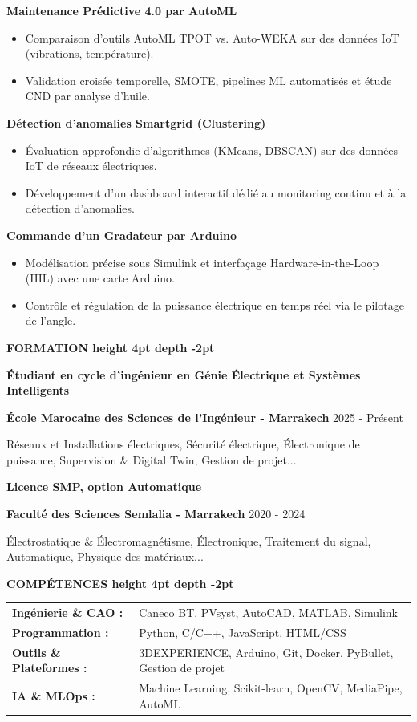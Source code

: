 \documentclass[10pt,a4paper]{altacv}
\renewcommand{\cvsection}[2][]{%
  \medskip%
  {\color{heading}\LARGE\bfseries #2 \hspace{0.2em}\leaders\vrule height 4pt depth -2pt\hfill\mbox{}}\par\smallskip
}
\renewcommand{\cvevent}[4]{%
  {\large\bfseries\color{accent}#1\par}
  \smallskip\normalsize
  \ifstrequal{#2}{}{}{%
    \textbf{\color{emphasis}#2\ifstrequal{#4}{}{}{ - #4}}%
  }%
  \hfill
  \ifstrequal{#3}{}{}{{\small#3}}%
  \par\smallskip
}
\begin{document}
{\large\bfseries\color{accent} Maintenance Prédictive 4.0 par AutoML}\\[0.05cm]
\begin{itemize}
  \item Comparaison d'outils AutoML TPOT vs. Auto-WEKA sur des données IoT (vibrations, température).
  \item Validation croisée temporelle, SMOTE, pipelines ML automatisés et étude CND par analyse d'huile.
\end{itemize}

{\large\bfseries\color{accent} Détection d'anomalies Smartgrid (Clustering)}\\[0.05cm]
\begin{itemize}
  \item Évaluation approfondie d'algorithmes (KMeans, DBSCAN) sur des données IoT de réseaux électriques.
  \item Développement d'un dashboard interactif dédié au monitoring continu et à la détection d'anomalies.
\end{itemize}

{\large\bfseries\color{accent} Commande d'un Gradateur par Arduino}\\[0.05cm]
\begin{itemize}
  \item Modélisation précise sous Simulink et interfaçage Hardware-in-the-Loop (HIL) avec une carte Arduino.
  \item Contrôle et régulation de la puissance électrique en temps réel via le pilotage de l'angle.
\end{itemize}


\cvsection{FORMATION}
\cvevent{Étudiant en cycle d'ingénieur en Génie Électrique et Systèmes Intelligents}{École Marocaine des Sciences de l'Ingénieur}{2025 - Présent}{Marrakech}
\small Réseaux et Installations électriques, Sécurité électrique, Électronique de puissance, Supervision \& Digital Twin, Gestion de projet...

\cvevent{Licence SMP, option Automatique}{Faculté des Sciences Semlalia}{2020 - 2024}{Marrakech}
\small Électrostatique \& Électromagnétisme, Électronique, Traitement du signal, Automatique, Physique des matériaux...

\cvsection{COMPÉTENCES}
\begin{tabular}{@{}ll@{}}
\textbf{Ingénierie \& CAO :} & Caneco BT, PVsyst, AutoCAD, MATLAB, Simulink \\[1pt]
\textbf{Programmation :} & Python, C/C++, JavaScript, HTML/CSS \\[1pt]
\textbf{Outils \& Plateformes :} & 3DEXPERIENCE, Arduino, Git, Docker, PyBullet, Gestion de projet \\[1pt]
\textbf{IA \& MLOps :} & Machine Learning, Scikit-learn, OpenCV, MediaPipe, AutoML \\
\end{tabular}
\end{document}
